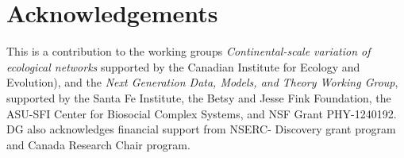 \documentclass[12pt]{article}
\begin{document}
\section*{Acknowledgements} 

This is a contribution to the working groups \emph {Continental-scale
variation of ecological networks} supported by the Canadian Institute for
Ecology and Evolution), and the \emph{Next Generation Data, Models, and
Theory Working Group}, supported by the Santa Fe Institute, the Betsy and
Jesse Fink Foundation, the ASU-SFI Center for Biosocial Complex Systems, and
NSF Grant PHY-1240192. DG also acknowledges financial support from NSERC-
Discovery grant program and Canada Research Chair program.

\newpage



\newpage
\end{document}
